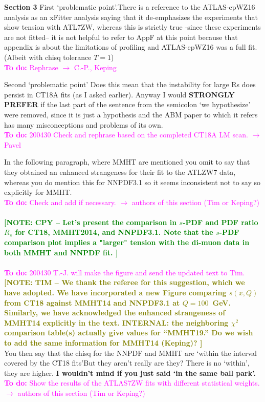 \documentclass[aps,prd,amsmath,nofootinbib,floatfix,fleqn]{revtex4}
\newcommand{\TODO}[1]{\textcolor{magenta}{
\quad\vspace{3pt} \\ {\bf To do:} #1 \\
}}
\newcommand{\NOTECPY}[1]{\textcolor{green}{ \bf[NOTE: CPY -- #1 ]}}
\newcommand{\NOTETIM}[1]{\textcolor{olive}{ \bf[NOTE: TIM -- #1 ]}}
\begin{document}
\noindent
{\bf Section 3} First ‘problematic point’.There is a reference to the ATLAS-epWZ16 analysis as an xFitter analysis saying that it de-emphasizes the experiments that show tension with ATL7ZW, whereas this is strictly true -since these experiments are not fitted-- it is not helpful to refer to AppF at this point because that appendix is about the limitations of profiling and ATLAS-epWZ16 was a full fit. (Albeit with chisq tolerance $T=1$)  
\TODO{Rephrase $\to$ C.-P., Keping}

\noindent
Second ‘problematic point’ Does this mean that the instability for large Rs does persist in CT18A fits (as I asked earlier). Anyway I would {\bf STRONGLY PREFER} if the last part of the sentence from the semicolon ‘we hypothesize’ were removed, since it is just a hypothesis and the ABM paper to which it refers has many misconceptions and problems of its own.  
\TODO{200430 Check and rephrase based on the completed CT18A LM scan. $\to$ Pavel}

\noindent
In the following paragraph, where MMHT are mentioned you omit to say that they obtained an enhanced
strangeness for their fit to the ATLZW7 data, whereas you do mention this for NNPDF3.1 so it seems
inconsistent not to say so explicitly for MMHT.  
\TODO{Check and add if necessary. $\to$ authors of this section (Tim or Keping?)}\\
\NOTECPY{Let's present the comparison in $s$-PDF and PDF ratio $R_s$ for CT18, MMHT2014, and NNPDF3.1. Note that the $s$-PDF comparison plot implies a "larger" tension with the di-muon data in both MMHT and NNPDF fit.}\\
\TODO{200430 T.-J. will make the figure and send the updated text to Tim.}
%
\NOTETIM{We thank the referee for this suggestion, which we have adopted. We have incorporated
a new Figure comparing $s(x,Q)$ from CT18 against MMHT14 and NNPDF3.1 at $Q\!=\!100$~GeV.
Similarly, we have acknowledged the enhanced strangeness of MMHT14 explicitly in the
text. INTERNAL: the neighboring $\chi^2$ comparison table(s) actually give values for
``MMHT19.'' Do we wish to add the same information for MMHT14 (Keping)?
}\\

\noindent
You then say that the chisq for the NNPDF and MMHT are ‘within the interval covered by the CT18 fits’But they aren’t really are they? There is no ‘within’, they are higher. {\bf I wouldn’t mind if you just said ‘in the same ball park’.}  
\TODO{Show the results of the ATLAS7ZW fits with different statistical weights. $\to$ authors of this section (Tim or Keping?)}
\end{document}
